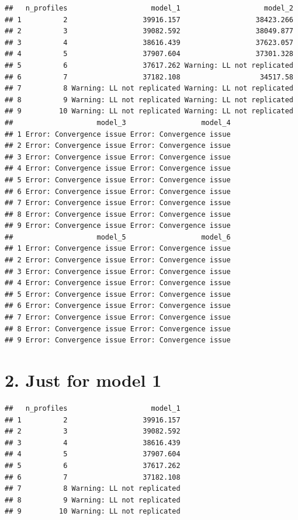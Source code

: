 \documentclass[]{book}
\theoremstyle{definition}
\theoremstyle{definition}
\theoremstyle{definition}
\theoremstyle{remark}
\begin{document}
\begin{verbatim}
##   n_profiles                    model_1                    model_2
## 1          2                  39916.157                  38423.266
## 2          3                  39082.592                  38049.877
## 3          4                  38616.439                  37623.057
## 4          5                  37907.604                  37301.328
## 5          6                  37617.262 Warning: LL not replicated
## 6          7                  37182.108                   34517.58
## 7          8 Warning: LL not replicated Warning: LL not replicated
## 8          9 Warning: LL not replicated Warning: LL not replicated
## 9         10 Warning: LL not replicated Warning: LL not replicated
##                    model_3                  model_4
## 1 Error: Convergence issue Error: Convergence issue
## 2 Error: Convergence issue Error: Convergence issue
## 3 Error: Convergence issue Error: Convergence issue
## 4 Error: Convergence issue Error: Convergence issue
## 5 Error: Convergence issue Error: Convergence issue
## 6 Error: Convergence issue Error: Convergence issue
## 7 Error: Convergence issue Error: Convergence issue
## 8 Error: Convergence issue Error: Convergence issue
## 9 Error: Convergence issue Error: Convergence issue
##                    model_5                  model_6
## 1 Error: Convergence issue Error: Convergence issue
## 2 Error: Convergence issue Error: Convergence issue
## 3 Error: Convergence issue Error: Convergence issue
## 4 Error: Convergence issue Error: Convergence issue
## 5 Error: Convergence issue Error: Convergence issue
## 6 Error: Convergence issue Error: Convergence issue
## 7 Error: Convergence issue Error: Convergence issue
## 8 Error: Convergence issue Error: Convergence issue
## 9 Error: Convergence issue Error: Convergence issue
\end{verbatim}

\section{2. Just for model 1}\label{just-for-model-1}

\begin{verbatim}
##   n_profiles                    model_1
## 1          2                  39916.157
## 2          3                  39082.592
## 3          4                  38616.439
## 4          5                  37907.604
## 5          6                  37617.262
## 6          7                  37182.108
## 7          8 Warning: LL not replicated
## 8          9 Warning: LL not replicated
## 9         10 Warning: LL not replicated
\end{verbatim}
\end{document}
